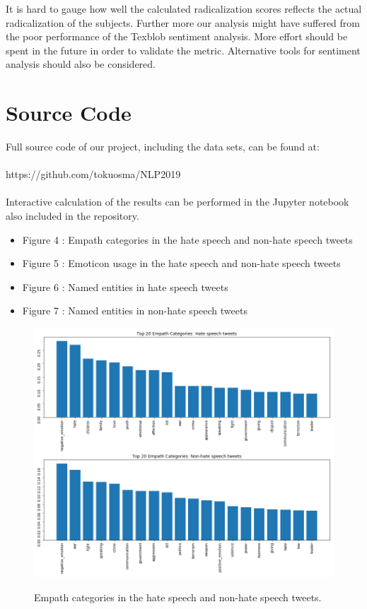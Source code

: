\documentclass[conference]{IEEEtran}
\begin{document}
It is hard to gauge how well the calculated radicalization scores reflects the actual radicalization 
of the subjects. Further more our analysis might have suffered from the poor performance of the 
Texblob sentiment analysis. More effort should be spent in the future in order to validate the metric.
Alternative tools for sentiment analysis should also be considered.

\section*{Source Code} 
Full source code of our project, including the data sets, can be found at:
\\\\
https://github.com/tokuosma/NLP2019
\\\\
Interactive calculation of the results can be performed in the Jupyter notebook 
also included in the repository.



\vspace{12pt}

\appendix


\begin{itemize}
    \item Figure 4 : Empath categories in the hate speech and non-hate speech tweets 
    \item Figure 5 : Emoticon usage in the hate speech and non-hate speech tweets 
    \item Figure 6 : Named entities in hate speech tweets
    \item Figure 7 : Named entities in non-hate speech tweets
\end{itemize}

\begin{figure}[!t] 
\centering 
\includegraphics[width=5.0in]{liwc_topics} \label{fig:liwc_topics} \hfil 
\caption{Empath categories in the hate speech and non-hate speech tweets.}     
\end{figure} 
\end{document}
